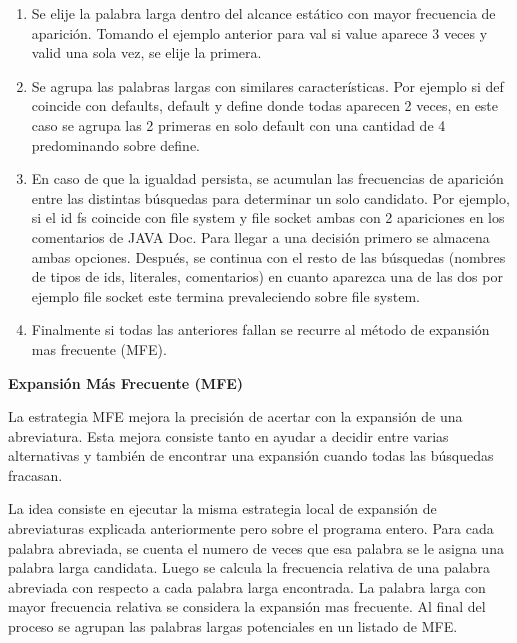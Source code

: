 \documentclass[a4paper,12pt]{report}
\begin{document}
\begin{enumerate}
\itemsep0em%
\item Se elije la palabra larga dentro del alcance estático con mayor frecuencia de aparición. Tomando el ejemplo anterior para \textsf{val} si \textsf{value} aparece 3 veces y \textsf{valid} una sola vez, se elije la primera.

\item Se agrupa las palabras largas con similares características. Por ejemplo si \textsf{def} coincide con \textsf{defaults}, \textsf{default} y \textsf{define} donde todas aparecen 2 veces, en este caso se agrupa las 2 primeras en solo \textsf{default} con una cantidad de 4 predominando sobre \textsf{define}.

\item En caso de que la igualdad persista, se acumulan las frecuencias de aparición entre las distintas búsquedas para determinar un solo candidato. Por ejemplo, si el id \textsf{fs} coincide con \textsf{file system} y \textsf{file socket} ambas con 2 apariciones en los comentarios de JAVA Doc. Para llegar a una decisión primero se almacena ambas opciones. Después, se continua con el resto de las búsquedas (nombres de tipos de ids, literales, comentarios) en cuanto aparezca una de las dos por ejemplo \textsf{file socket} este termina prevaleciendo sobre \textsf{file system}.

\item Finalmente si todas las anteriores fallan se recurre al método de expansión mas frecuente (MFE). 

\end{enumerate}

\noindent \textbf{Expansión Más Frecuente (MFE)\\}


La estrategia MFE\cite{EZH08} mejora la precisión de acertar con la expansión de una abreviatura. Esta mejora consiste tanto en ayudar a decidir entre varias alternativas y también de encontrar una expansión cuando todas las búsquedas fracasan. 

La idea consiste en ejecutar la misma estrategia local de expansión de abreviaturas explicada anteriormente pero sobre el programa entero. Para cada palabra abreviada, se cuenta el numero de veces que esa palabra se le asigna una palabra larga candidata. Luego se calcula la frecuencia relativa de una palabra abreviada con respecto a cada palabra larga encontrada. La palabra larga con mayor frecuencia relativa se considera la expansión mas frecuente. Al final del proceso se agrupan las palabras largas potenciales en un listado de MFE.
\end{document}

